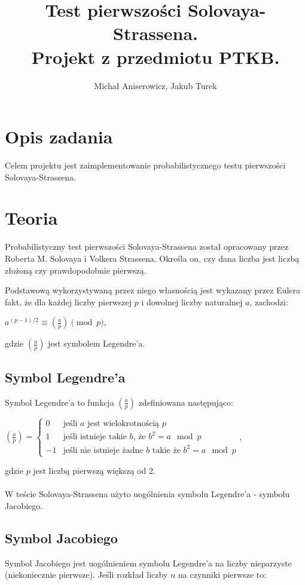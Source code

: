 \documentclass[a4paper,10pt]{article}
\title{Test pierwszości Solovaya-Strassena. \\ \small{Projekt z przedmiotu PTKB.}}
\author{Michał Aniserowicz, Jakub Turek}
\date{}
\begin{document}
\maketitle

\section{Opis zadania} \label{sec:task_desc}
Celem projektu jest zaimplementowanie probabilistycznego testu pierwszości Solovaya-Strassena.

\section{Teoria}
Probabilistyczny test pierwszości Solovaya-Strassena został opracowany przez Roberta M. Solovaya i Volkera Strassena.
Określa on, czy dana liczba jest liczbą złożoną czy prawdopodobnie pierwszą.

Podstawową wykorzystywaną przez niego własnością jest wykazany przez Eulera fakt, że dla każdej liczby pierwszej $p$ i dowolnej liczby naturalnej $a$, zachodzi:

$a^{(p-1)/2} \equiv \left(\frac{a}{p}\right) \pmod p$,

gdzie $\left(\frac{a}{p}\right)$ jest symbolem Legendre'a.

 \subsection{Symbol Legendre'a}
 Symbol Legendre'a to funkcja $\left( \frac a p \right)$ zdefiniowana następująco:

 $
 \left( \frac a p \right) = 
 \begin{cases}
   0 & \mbox{jeśli $a$ jest wielokrotnością $p$} \\
   1 & \mbox{jeśli istnieje takie $b$, że $b^2=a \mod p$} \\
  -1 & \mbox{jeśli nie istnieje żadne $b$ takie że $b^2=a \mod p$}
 \end{cases}
 $,

 gdzie $p$ jest liczbą pierwszą większą od 2.
 
 \paragraph{}
 W teście Solovaya-Strassena użyto uogólnienia symbolu Legendre'a - symbolu Jacobiego.

 \subsection{Symbol Jacobiego}
 Symbol Jacobiego jest uogólnieniem symbolu Legendre'a na liczby nieparzyste (niekoniecznie pierwsze).
 Jeśli rozkład liczby $n$ na czynniki pierwsze to:
 
\end{document}

